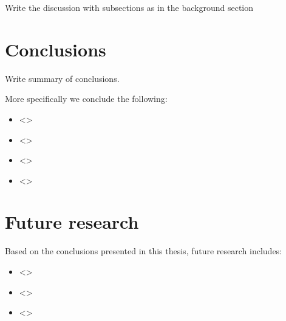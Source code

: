\documentclass[11pt,a4paper,twoside,openany]{book}\usepackage{knitr}
\begin{document}
{Write the discussion with subsections as in the background section


%

\chapter{Conclusions}

Write summary of conclusions.

More specifically we conclude the following:

\begin{itemize}

\item <>

\item <>

\item <>

\item <> 

\end{itemize}


%

\chapter{Future research}

Based on the conclusions presented in this thesis, future research includes: 

\begin{itemize}
\item <>

\item <>

\item <>
\end{itemize}

\appendix


}
\end{document}
